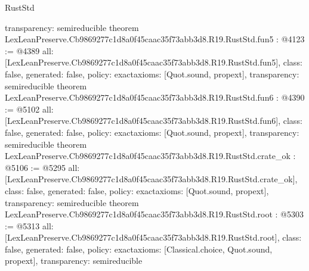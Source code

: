 \begin{lexlean}{RustStd}
\begin{coremodule}
{  transparency: semireducible
}
theorem LexLeanPreserve.Cb9869277c1d8a0f45caac35f73abb3d8.R19.RustStd.fun5 : @4123 := @4389 {
  all: [LexLeanPreserve.Cb9869277c1d8a0f45caac35f73abb3d8.R19.RustStd.fun5],
  class: false,
  generated: false,
  policy: exact{axioms: [Quot.sound, propext]},
  transparency: semireducible
}
theorem LexLeanPreserve.Cb9869277c1d8a0f45caac35f73abb3d8.R19.RustStd.fun6 : @4390 := @5102 {
  all: [LexLeanPreserve.Cb9869277c1d8a0f45caac35f73abb3d8.R19.RustStd.fun6],
  class: false,
  generated: false,
  policy: exact{axioms: [Quot.sound, propext]},
  transparency: semireducible
}
theorem LexLeanPreserve.Cb9869277c1d8a0f45caac35f73abb3d8.R19.RustStd.crate_ok : @5106 := @5295 {
  all: [LexLeanPreserve.Cb9869277c1d8a0f45caac35f73abb3d8.R19.RustStd.crate_ok],
  class: false,
  generated: false,
  policy: exact{axioms: [Quot.sound, propext]},
  transparency: semireducible
}
theorem LexLeanPreserve.Cb9869277c1d8a0f45caac35f73abb3d8.R19.RustStd.root : @5303 := @5313 {
  all: [LexLeanPreserve.Cb9869277c1d8a0f45caac35f73abb3d8.R19.RustStd.root],
  class: false,
  generated: false,
  policy: exact{axioms: [Classical.choice, Quot.sound, propext]},
  transparency: semireducible
}


\end{coremodule}
\end{lexlean}
